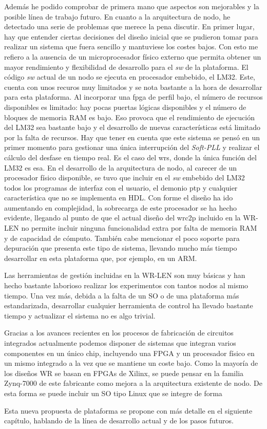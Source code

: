 Además he podido comprobar de primera mano que aspectos son mejorables y la 
posible línea de trabajo futuro. En cuanto a la arquitectura de nodo, he 
detectado una serie de problemas que merece la pena discutir. En primer lugar, 
hay que entender ciertas decisiones del diseño inicial que se pudieron tomar 
para realizar un sistema que fuera sencillo y mantuviese los costes bajos. Con 
esto me refiero a la ausencia de un microprocesador físico externo que permita 
obtener un mayor rendimiento y flexibilidad de desarrollo para el \textit{sw} 
de la plataforma. El código \textit{sw} actual de un nodo se ejecuta en 
procesador embebido, el LM32. Este, cuenta con unos recuros muy limitados y se 
nota 
bastante a la hora de desarrollar para esta plataforma. Al incorporar una 
\gls{fpga} de perfil bajo, el número de recursos disponibles es limitado: hay 
pocas puertas lógicas disponibles y el número de bloques de memoria RAM es 
bajo. Eso provoca que el rendimiento de ejecución del LM32 sea bastante bajo y 
el desarrollo de nuevas características está limitado por la falta de recursos. 
Hay que tener en cuenta que este sistema se pensó en un primer momento para 
gestionar una única interrupción del \textit{Soft-PLL} y realizar el cálculo 
del desfase en tiempo real. Es el caso del \gls{wrs}, donde la única función 
del LM32 es esa. En el desarrollo de la arquitectura de nodo, al carecer de un 
procesador físico disponible, se tuvo que incluir en el \textit{sw} embebido 
del LM32 todos los programas de interfaz con el usuario, el demonio \gls{ptp} y 
cualquier característica que no se implementa en HDL. Con forme el diseño ha 
ido aumentando en complejidad, la sobrecarga de este procesador se ha hecho 
evidente, llegando al punto de que el actual diseño del \gls{wrc2p} incluido en 
la WR-LEN no permite incluir ninguna funcionalidad extra por falta de memoria 
RAM y de capacidad de cómputo. También cabe mencionar el poco soporte para 
depuración que presenta este tipo de sistema, llevando mucho más tiempo 
desarrollar en esta plataforma que, por ejemplo, en un ARM.

Las herramientas de gestión incluidas en la WR-LEN son muy básicas y han hecho 
bastante laborioso realizar los experimentos con tantos nodos al mismo tiempo. 
Una vez más, debida a la falta de un SO o de una plataforma más estandarizada, 
desarrollar cualquier herramienta de control ha llevado bastante tiempo y 
actualizar el sistema no es algo trivial.

Gracias a los avances recientes en los procesos de fabricación de circuitos 
integrados actualmente podemos disponer de sistemas que integran varios 
componentes en un único chip, incluyendo una FPGA y un procesador físico en un 
mismo integrado a la vez que se mantiene un coste bajo. Como la mayoría de los 
diseños WR se basan en FPGAs de Xilinx, se puede pensar en la familia Zynq-7000 
de este fabricante como mejora a la arquitectura existente de nodo. De esta 
forma se puede incluir un SO tipo Linux que se integre de forma 

Esta nueva propuesta de plataforma se propone con más detalle en el siguiente 
capítulo, hablando de la línea de desarrollo actual y de los pasos futuros.


